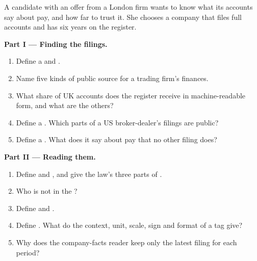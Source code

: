 \begin{problem}\label{pb:in:reading-a-trading-firms-accounts:1}
A candidate with an offer from a London firm wants to know what its accounts say about pay, and how far to trust it.
She chooses a company that files full accounts and has six years on the register.

\medskip\noindent\textbf{Part I --- Finding the filings.}
\begin{enumerate}
\item Define a  and .
\item Name five kinds of public source for a trading firm's finances.
\item What share of UK accounts does the register receive in machine-readable form, and what are the others?
\item Define a . Which parts of a US broker-dealer's filings are public?
\item Define a . What does it say about pay that no other filing does?
\end{enumerate}

\medskip\noindent\textbf{Part II --- Reading them.}
\begin{enumerate}[resume]
\item Define  and , and give the law's three parts of .
\item Who is not in the ?
\item Define  and .
\item Define . What do the context, unit, scale, sign and format of a tag give?
\item Why does the company-facts reader keep only the latest filing for each period?
\end{enumerate}


\end{problem}
